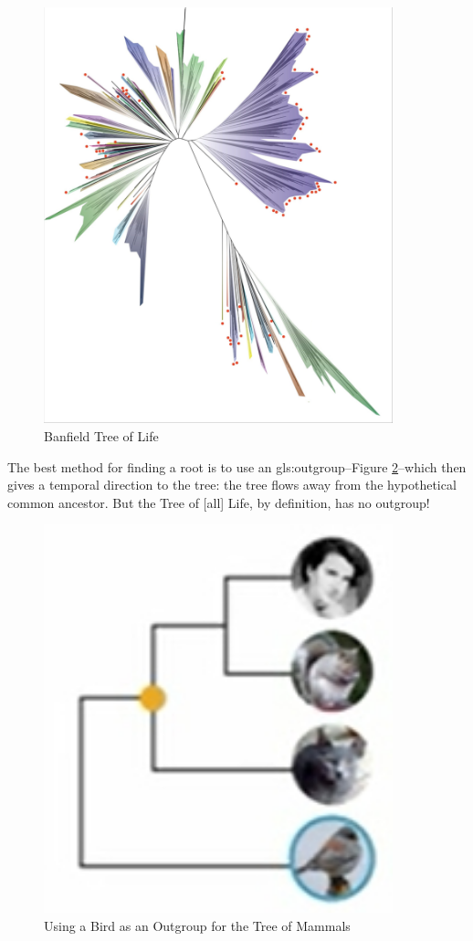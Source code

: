 \documentclass[]{article}
\begin{document}
\begin{figure}[H]
	\caption{Banfield Tree of Life}\label{fig:banfield:tol}
	\includegraphics[width=0.9\textwidth]{TOL4}
\end{figure}

The best method for finding a root is to use an \gls{gls:outgroup}--Figure \ref{fig:bird:outgroup}--which then gives a temporal direction to the tree: the tree flows away from the hypothetical common ancestor. But the Tree of [all] Life, by definition, has no outgroup!

\begin{figure}[H]
	\caption{Using a Bird as an Outgroup for the Tree of Mammals}\label{fig:bird:outgroup}
	\includegraphics[width=0.9\textwidth]{Outgroup}
\end{figure}
\end{document}
